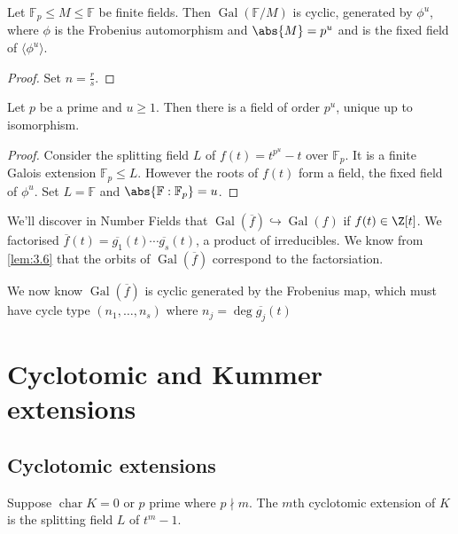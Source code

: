 \documentclass{article}
\DeclareMathOperator{\chara}{char}
\DeclareMathOperator{\Gal}{Gal}
\newcommand{\F}{\mathbb{F}}
\begin{document}
\begin{ncor}\label{cor:3.17}
    Let $\F_p \leq M \leq \F$ be finite fields.
    Then $\Gal(\F/M)$ is cyclic, generated by $\phi^u$, where $\phi$ is the Frobenius automorphism and $\abs{M} = p^u$ and is the fixed field of $\langle \phi^u \rangle$.
\end{ncor}

\begin{proof}
    Set $n = \frac{r}{s}$.
\end{proof}

\begin{nthm}\label{thm:3.18}
    Let $p$ be a prime and $u \geq 1$.
    Then there is a field of order $p^u$, unique up to isomorphism.
\end{nthm}

\begin{proof}
    Consider the splitting field $L$ of $f(t) = t^{p^u} - t$ over $\F_p$.
    It is a finite Galois extension $\F_p \leq L$.
    However the roots of $f(t)$ form a field, the fixed field of $\phi^u$.
    Set $L = \F$ and $\abs{\F :\F_p} = u$.
\end{proof}

\begin{remark}
    We'll discover in Number Fields that $\Gal(\overline{f}) \hookrightarrow \Gal(f)$ if $f(t) \in \Z[t]$.
    We factorised $\overline{f}(t) = \overline{g_1}(t) \dotsm \overline{g_s}(t)$, a product of irreducibles.
    We know from \cref{lem:3.6} that the orbits of $\Gal(\overline{f})$ correspond to the factorsiation.

    We now know $\Gal(\overline{f})$ is cyclic generated by the Frobenius map, which must have cycle type $(n_1, \dotsc, n_s)$ where $n_j = \deg \overline{g_j}(t)$
\end{remark}

\section{Cyclotomic and Kummer extensions}
\subsection{Cyclotomic extensions}
\begin{ndef}\label{def:4.1}
    Suppose $\chara K = 0$ or $p$ prime where $p \nmid m$.
    The $m$th cyclotomic extension of $K$ is the splitting field $L$ of $t^m - 1$.
\end{ndef}
\end{document}
